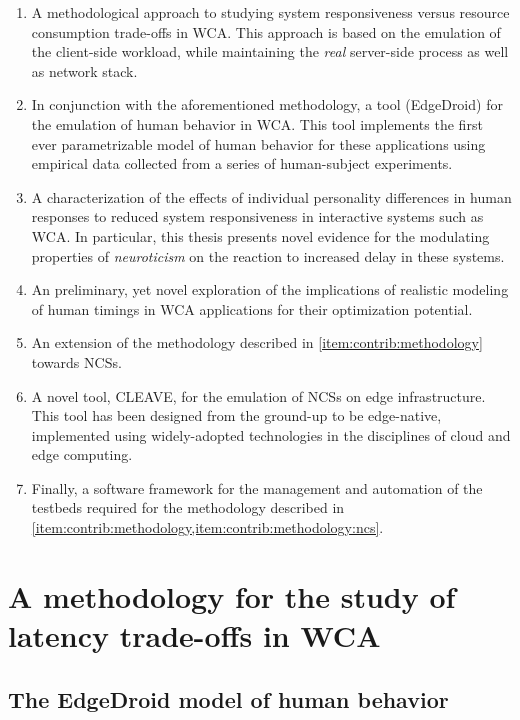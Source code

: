 \begin{enumerate}
    \item\label{item:contrib:methodology} A methodological approach to studying system responsiveness versus resource consumption trade-offs in \ac{WCA}.
    This approach is based on the emulation of the client-side workload, while maintaining the \emph{real} server-side process as well as network stack.
    \item In conjunction with the aforementioned methodology, a tool (EdgeDroid) for the emulation of human behavior in \ac{WCA}.
    This tool implements the first ever parametrizable model of human behavior for these applications using empirical data collected from a series of human-subject experiments.
    \item A characterization of the effects of individual personality differences in human responses to reduced system responsiveness in interactive systems such as \acl{WCA}.
    In particular, this thesis presents novel evidence for the modulating properties of \emph{neuroticism} on the reaction to increased delay in these systems.
    \item An preliminary, yet novel exploration of the implications of realistic modeling of human timings in \ac{WCA} applications for their optimization potential.
    \item\label{item:contrib:methodology:ncs} An extension of the methodology described in \cref{item:contrib:methodology} towards \acp{NCS}.
    \item A novel tool, CLEAVE, for the emulation of \acp{NCS} on edge infrastructure.
    This tool has been designed from the ground-up to be edge-native, implemented using widely-adopted technologies in the disciplines of cloud and edge computing.
    \item Finally, a software framework for the management and automation of the testbeds required for the methodology described in \cref{item:contrib:methodology,item:contrib:methodology:ncs}.
\end{enumerate}

\section{A methodology for the study of latency trade-offs in \acs{WCA}}

\subsection{The EdgeDroid model of human behavior}

